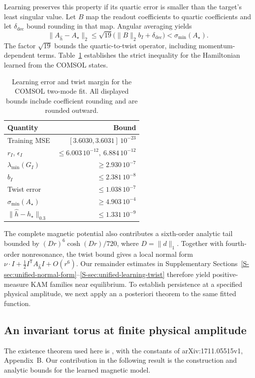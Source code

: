 Learning preserves this property if its quartic error is smaller than
the target's least singular value. Let $B$ map the readout coefficients
to quartic coefficients and let $\delta_{\mathrm{dec}}$ bound rounding
in that map. Angular averaging yields
\begin{equation}
 \|A_{\widehat h}-A_\star\|_2
 \leq\sqrt{19}\bigl(\|B\|_2b_I+\delta_{\mathrm{dec}}\bigr)
 <\sigma_{\min}(A_\star).
 \label{core-eq-twist-transfer}
\end{equation}
The factor $\sqrt{19}$ bounds the quartic-to-twist operator, including
momentum-dependent terms. Table~\ref{core-tab-transfer} establishes
the strict inequality for the Hamiltonian learned from the COMSOL states.

\begin{table}[t]
\centering\small
\caption{Learning error and twist margin for the COMSOL two-mode fit.
All displayed bounds include coefficient rounding and are rounded outward.}
\label{core-tab-transfer}
\begin{tabular}{lr}
\toprule
Quantity & Bound\\
\midrule
Training MSE & $[3.6030,3.6031]\,10^{-23}$\\
$r_I$, $\epsilon_I$ & $\leq6.003\,10^{-12},\ 6.884\,10^{-12}$\\
$\lambda_{\min}(G_I)$ & $\geq2.930\,10^{-7}$\\
$b_I$ & $\leq2.381\,10^{-8}$\\
Twist error & $\leq1.038\,10^{-7}$\\
$\sigma_{\min}(A_\star)$ & $\geq4.903\,10^{-4}$\\
$\|\widehat h-h_\star\|_{0.3}$ & $\leq1.331\,10^{-9}$\\
\bottomrule
\end{tabular}
\end{table}

The complete magnetic potential also contributes a sixth-order analytic
tail bounded by $(Dr)^6\cosh(Dr)/720$, where $D=\|d\|_1$.
Together with fourth-order nonresonance, the twist bound gives a local
normal form $\nu\cdot I+\tfrac12I^{\mathsf T}A_{\widehat h}I+O(r^6)$.
Our remainder estimates in Supplementary
Sections~\ref{S-sec:unified-normal-form}--\ref{S-sec:unified-learning-twist}
therefore yield positive-measure KAM families near equilibrium.
To establish persistence at a specified physical amplitude, we next
apply an a posteriori theorem to the same fitted function.

\subsection{An invariant torus at finite physical amplitude}
\label{core-sec-finite-torus}
The existence theorem used here is
\citet[Theorem~3.1]{haro2019aposteriori}, with the constants of
arXiv:1711.05515v1, Appendix~B. Our contribution in the following result
is the construction and analytic bounds for the learned magnetic model.

